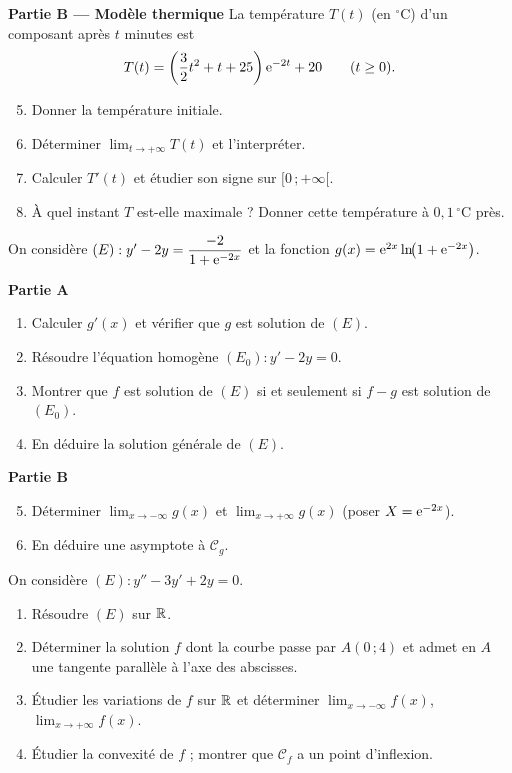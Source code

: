 \textbf{Partie B — Modèle thermique}
La température $T(t)$ (en $^{\circ}$C) d'un composant après $t$ minutes est
\[
T(t)=\left(\frac32 t^{2}+t+25\right)\mathrm{e}^{-2t}+20\qquad (t\geq 0).
\]
\begin{enumerate}
	\setcounter{enumi}{4}
	\item Donner la température initiale.
	\item Déterminer $\displaystyle\lim_{t\to+\infty}T(t)$ et l'interpréter.
	\item Calculer $T'(t)$ et étudier son signe sur $[0\,;+\infty[$.
	\item À quel instant $T$ est-elle maximale ? Donner cette température à
	$0{,}1\,^{\circ}$C près.
\end{enumerate}

On considère $(E):y'-2y=\dfrac{-2}{1+\mathrm{e}^{-2x}}$ et la fonction
$g(x)=\mathrm{e}^{2x}\ln\!\bigl(1+\mathrm{e}^{-2x}\bigr)$.

\textbf{Partie A}
\begin{enumerate}
	\item Calculer $g'(x)$ et vérifier que $g$ est solution de $(E)$.
	\item Résoudre l'équation homogène $(E_0):y'-2y=0$.
	\item Montrer que $f$ est solution de $(E)$ si et seulement si $f-g$ est
	solution de $(E_0)$.
	\item En déduire la solution générale de $(E)$.
\end{enumerate}

\textbf{Partie B}
\begin{enumerate}
	\setcounter{enumi}{4}
	\item Déterminer $\displaystyle\lim_{x\to-\infty}g(x)$ et
	$\displaystyle\lim_{x\to+\infty}g(x)$ (poser $X=\mathrm{e}^{-2x}$).
	\item En déduire une asymptote à $\mathcal C_g$.
\end{enumerate}

On considère $(E):y''-3y'+2y=0$.
\begin{enumerate}
	\item Résoudre $(E)$ sur $\mathbb{R}$.
	\item Déterminer la solution $f$ dont la courbe passe par $A(0\,;4)$ et
	admet en $A$ une tangente parallèle à l'axe des abscisses.
	\item Étudier les variations de $f$ sur $\mathbb{R}$ et déterminer
	$\displaystyle\lim_{x\to-\infty}f(x)$, $\displaystyle\lim_{x\to+\infty}f(x)$.
	\item Étudier la convexité de $f$ ; montrer que $\mathcal C_f$ a un point
	d'inflexion.
\end{enumerate}

